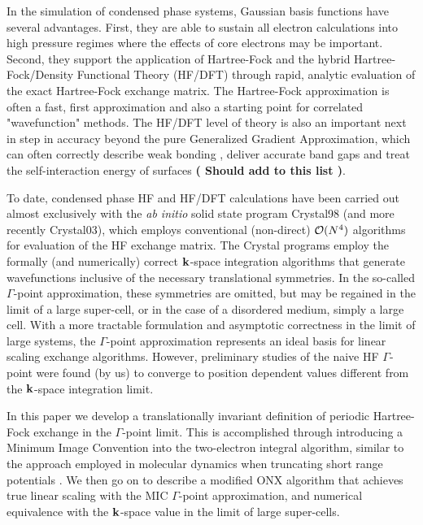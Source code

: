 \documentclass[prb,aps,nobibnotes,twocolumn,doublespace,twocolumngrid,superbib]{revtex4}
\begin{document}
In the simulation of condensed phase systems, Gaussian basis functions have several 
advantages.  First, they are able to sustain all electron calculations into high 
pressure regimes where the effects of core electrons may be important. Second, they
support the application of Hartree-Fock and the hybrid Hartree-Fock/Density Functional 
Theory (HF/DFT) \cite{Gill92,ABecke93,ABecke93b,VBarone96,CAdammo99} through rapid, 
analytic evaluation of the exact Hartree-Fock exchange matrix.  
The Hartree-Fock approximation is often a fast, first approximation and also a starting point 
for correlated "wavefunction" methods.  The HF/DFT level of theory is also an important next 
in step in accuracy beyond the pure Generalized Gradient Approximation, which can often correctly 
describe  weak bonding \cite{}, deliver accurate band gaps \cite{} and treat the self-interaction 
energy of surfaces \cite{} {\bf( Should add to this list )}.  

To date, condensed phase HF and HF/DFT calculations have been carried out almost 
exclusively with the {\em ab initio} solid state program {\sc Crystal98} \cite{} (and
more recently {\sc Crystal03}), which employs conventional (non-direct) ${\cal O}(N^4)$ 
algorithms for evaluation of the HF exchange matrix.  The {\sc Crystal} programs employ the
formally (and numerically) correct $\bf k$-space integration algorithms that generate 
wavefunctions inclusive of the necessary translational symmetries.   In the so-called $\Gamma$-point
approximation, these symmetries are omitted, but may be regained in the limit of a large
super-cell, or in the case of a disordered medium, simply a large cell.  With a more
tractable formulation and asymptotic correctness in the limit of large systems, the
$\Gamma$-point approximation represents an ideal basis for linear scaling exchange 
algorithms.  However, preliminary studies of the naive HF $\Gamma$-point were found (by us)
to converge to position dependent values different from the $\bf k$-space integration 
limit.  

In this paper we develop a translationally invariant definition of periodic Hartree-Fock exchange 
in the $\Gamma$-point limit.  This is accomplished through introducing a Minimum Image Convention
into the two-electron integral algorithm, similar to the approach employed in molecular dynamics when 
truncating short range potentials \cite{}.  We then go on to describe a modified {\sc ONX} 
algorithm \cite{} that achieves true linear scaling with the MIC $\Gamma$-point approximation, and 
numerical equivalence with the $\bf k$-space value in the limit of large super-cells.
\end{document}
